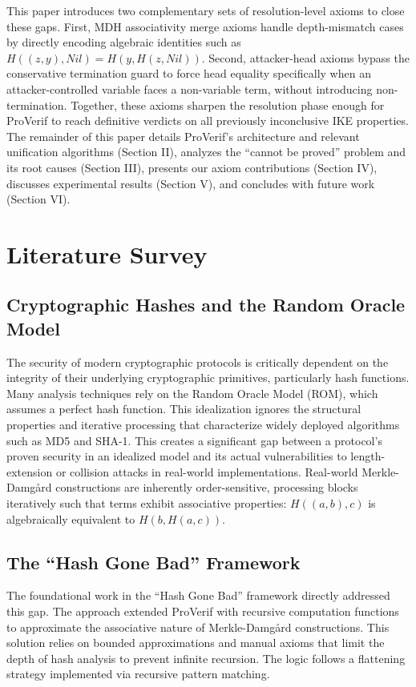 \documentclass[journal]{IEEEtran}
\begin{document}
This paper introduces two complementary sets of resolution-level axioms to close these gaps. First, MDH associativity merge axioms handle depth-mismatch cases by directly encoding algebraic identities such as $H((z,y), Nil) = H(y, H(z, Nil))$. Second, attacker-head axioms bypass the conservative termination guard to force head equality specifically when an attacker-controlled variable faces a non-variable term, without introducing non-termination. Together, these axioms sharpen the resolution phase enough for ProVerif to reach definitive verdicts on all previously inconclusive IKE properties. The remainder of this paper details ProVerif's architecture and relevant unification algorithms (Section II), analyzes the ``cannot be proved'' problem and its root causes (Section III), presents our axiom contributions (Section IV), discusses experimental results (Section V), and concludes with future work (Section VI).

\section{Literature Survey}

\subsection{Cryptographic Hashes and the Random Oracle Model}
The security of modern cryptographic protocols is critically dependent on the integrity of their underlying cryptographic primitives, particularly hash functions. Many analysis techniques rely on the Random Oracle Model (ROM), which assumes a perfect hash function. This idealization ignores the structural properties and iterative processing that characterize widely deployed algorithms such as MD5 and SHA-1.  This creates a significant gap between a protocol's proven security in an idealized model and its actual vulnerabilities to length-extension or collision attacks in real-world implementations. Real-world Merkle-Damg\aa{}rd constructions are inherently order-sensitive, processing blocks iteratively such that terms exhibit associative properties: $H((a,b), c)$ is algebraically equivalent to $H(b, H(a, c))$.

\subsection{The ``Hash Gone Bad'' Framework}
The foundational work in the ``Hash Gone Bad'' framework \cite{cheval2023hash} directly addressed this gap. The approach extended ProVerif with recursive computation functions to approximate the associative nature of Merkle-Damg\aa{}rd constructions. This solution relies on bounded approximations and manual axioms that limit the depth of hash analysis to prevent infinite recursion. The logic follows a flattening strategy implemented via recursive pattern matching.
\end{document}
